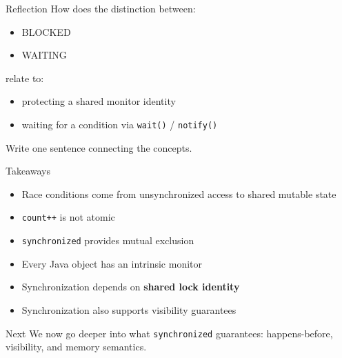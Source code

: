 \documentclass[aspectratio=169,11pt]{beamer}
\begin{document}
	\begin{frame}{Reflection}
		How does the distinction between:
		\begin{itemize}
			\item BLOCKED
			\item WAITING
		\end{itemize}
		relate to:
		\begin{itemize}
			\item protecting a shared monitor identity
			\item waiting for a condition via \texttt{wait()} / \texttt{notify()}
		\end{itemize}
		
		\bigskip
		Write one sentence connecting the concepts.
	\end{frame}
	
	\begin{frame}{Takeaways}
		\begin{itemize}
			\item Race conditions come from unsynchronized access to shared mutable state
			\item \texttt{count++} is not atomic
			\item \texttt{synchronized} provides mutual exclusion
			\item Every Java object has an intrinsic monitor
			\item Synchronization depends on \textbf{shared lock identity}
			\item Synchronization also supports visibility guarantees
		\end{itemize}
		
		\vspace{0.3cm}
		\begin{alertblock}{Next}
			We now go deeper into what \texttt{synchronized} guarantees:
			happens-before, visibility, and memory semantics.
		\end{alertblock}
	\end{frame}
	
\end{document}
